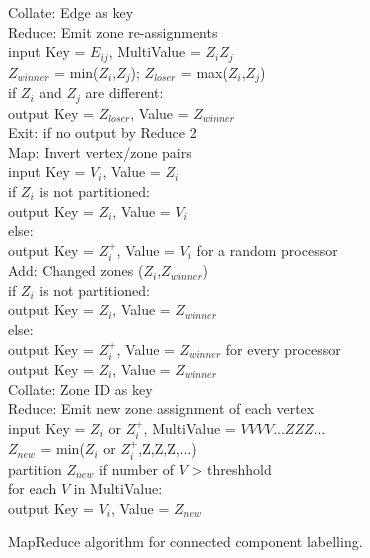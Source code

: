 \begin{figure}[htb]
\begin{center}
{\begin{minipage}{\textwidth}
\begin{tabbing}
 Collate: \> Edge as key \\
 Reduce: \> Emit zone re-assignments \\
       \> \> \> input Key = $E_{ij}$, MultiValue = $Z_i Z_j$ \\
       \> \> \> $Z_{winner}$ = min($Z_i$,$Z_j$); $Z_{loser}$ = max($Z_i$,$Z_j$) \\
       \> \> \> if $Z_i$ and $Z_j$ are different: \\
      \> \> \> \> output Key = $Z_{loser}$, Value = $Z_{winner}$ \\
 Exit: \> if no output by Reduce 2 \\
 Map: \> Invert vertex/zone pairs \\
    \> \> \> input Key = $V_i$, Value = $Z_i$ \\
    \> \> \> if $Z_i$ is not partitioned: \\
   \> \> \> \> output Key = $Z_i$, Value = $V_i$ \\
    \> \> \> else: \\
   \> \> \> \> output Key = $Z_i^+$, Value = $V_i$ for a random processor \\
 Add: \> Changed zones ($Z_i$,$Z_{winner}$) \\
    \> \> \> if $Z_i$ is not partitioned: \\
   \> \> \> \> output Key = $Z_i$, Value = $Z_{winner}$ \\
    \> \> \> else: \\
   \> \> \> \> output Key = $Z_i^+$, Value = $Z_{winner}$ for every processor \\
   \> \> \> \> output Key = $Z_i$, Value = $Z_{winner}$ \\
 Collate: \> Zone ID as key \\
 Reduce: \> Emit new zone assignment of each vertex \\
       \> \> \> input Key = $Z_i$ or $Z_i^+$, MultiValue = $V V V V ... Z Z Z ...$ \\
       \> \> \> $Z_{new}$ = min($Z_i$ or $Z_i^+$,Z,Z,Z,...) \\
       \> \> \> partition $Z_{new}$ if number of $V$ > threshhold \\
       \> \> \> for each $V$ in MultiValue: \\
      \> \> \> \> output Key = $V_i$, Value = $Z_{new}$

  \end{tabbing}
 \end{minipage}}\end{center}

 \caption{MapReduce algorithm for connected component labelling.}

 \label{fig:cc}
\end{figure}

